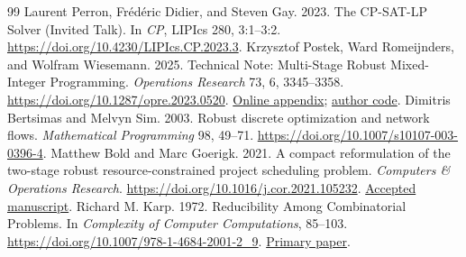 \documentclass[acmsmall,screen,review,anonymous]{acmart}
\begin{document}
\begin{thebibliography}{99}
 Laurent Perron, Fr\'{e}d\'{e}ric Didier, and Steven Gay. 2023. The CP-SAT-LP Solver (Invited Talk). In \emph{CP}, LIPIcs 280, 3:1--3:2. \url{https://doi.org/10.4230/LIPIcs.CP.2023.3}.
 Krzysztof Postek, Ward Romeijnders, and Wolfram Wiesemann. 2025. Technical Note: Multi-Stage Robust Mixed-Integer Programming. \emph{Operations Research} 73, 6, 3345--3358. \url{https://doi.org/10.1287/opre.2023.0520}. \href{https://pubsonline.informs.org/doi/suppl/10.1287/opre.2023.0520/suppl_file/opre.2023.0520.sm1.pdf}{Online appendix}; \href{https://www.doc.ic.ac.uk/~wwiesema/multi-stage-ro.zip}{author code}.
 Dimitris Bertsimas and Melvyn Sim. 2003. Robust discrete optimization and network flows. \emph{Mathematical Programming} 98, 49--71. \url{https://doi.org/10.1007/s10107-003-0396-4}.
 Matthew Bold and Marc Goerigk. 2021. A compact reformulation of the two-stage robust resource-constrained project scheduling problem. \emph{Computers \& Operations Research}. \url{https://doi.org/10.1016/j.cor.2021.105232}. \href{https://eprints.lancs.ac.uk/151025/1/paper.pdf}{Accepted manuscript}.
 Richard M. Karp. 1972. Reducibility Among Combinatorial Problems. In \emph{Complexity of Computer Computations}, 85--103. \url{https://doi.org/10.1007/978-1-4684-2001-2_9}. \href{https://www2.seas.gwu.edu/~simhaweb/champalg/tsp/papers/KarpOriginal.pdf}{Primary paper}.

\end{thebibliography}
\end{document}
